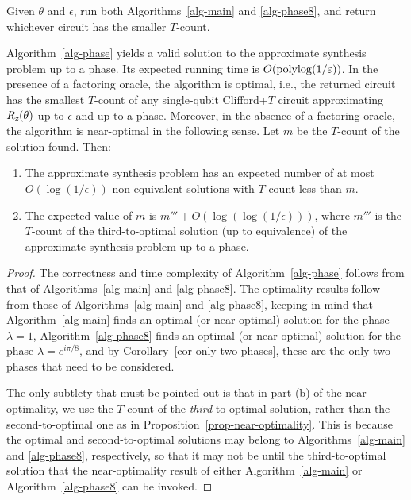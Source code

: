 \documentclass{article}
\begin{document}
\begin{algorithm}
  \label{alg-phase}
  Given $\theta$ and $\epsilon$, run both Algorithms~\ref{alg-main}
  and {\ref{alg-phase8}}, and return whichever circuit has the smaller
  $T$-count. 
\end{algorithm}

\begin{proposition}
  Algorithm~\ref{alg-phase} yields a valid solution to the approximate
  synthesis problem up to a phase. Its expected running time is
  $O(\mathop{\rm polylog}\nolimits(1/\varepsilon))$. In the presence of a factoring oracle, the
  algorithm is optimal, i.e., the returned circuit has the smallest
  $T$-count of any single-qubit Clifford+$T$ circuit approximating
  $R_{\textsl{z}}(\theta)$ up to $\epsilon$ and up to a phase.  Moreover, in the
  absence of a factoring oracle, the algorithm is near-optimal in the
  following sense. Let $m$ be the $T$-count of the solution
  found. Then:
  \begin{enumerate}\alphalabels
  \item The approximate synthesis problem has an expected number of at
    most $O(\log(1/\epsilon))$ non-equivalent solutions with $T$-count
    less than $m$.
  \item The expected value of $m$ is $m''' +
    O(\log(\log(1/\epsilon)))$, where $m'''$ is the $T$-count of the
    third-to-optimal solution (up to equivalence) of the approximate
    synthesis problem up to a phase.
  \end{enumerate}
\end{proposition}

\begin{proof}
  The correctness and time complexity of Algorithm~\ref{alg-phase}
  follows from that of Algorithms~\ref{alg-main} and
  {\ref{alg-phase8}}. The optimality results follow from those of
  Algorithms~\ref{alg-main} and {\ref{alg-phase8}}, keeping in mind
  that Algorithm~\ref{alg-main} finds an optimal (or near-optimal)
  solution for the phase $\lambda=1$, Algorithm~\ref{alg-phase8} finds
  an optimal (or near-optimal) solution for the phase
  $\lambda=e^{i\pi/8}$, and by Corollary~\ref{cor-only-two-phases},
  these are the only two phases that need to be considered.

  The only subtlety that must be pointed out is that in part (b) of
  the near-optimality, we use the $T$-count of the {\em
    third}-to-optimal solution, rather than the second-to-optimal one
  as in Proposition~\ref{prop-near-optimality}. This is because the
  optimal and second-to-optimal solutions may belong to
  Algorithms~\ref{alg-main} and {\ref{alg-phase8}}, respectively, so
  that it may not be until the third-to-optimal solution that the
  near-optimality result of either Algorithm~\ref{alg-main} or
  Algorithm~\ref{alg-phase8} can be invoked.
\end{proof}
\end{document}
